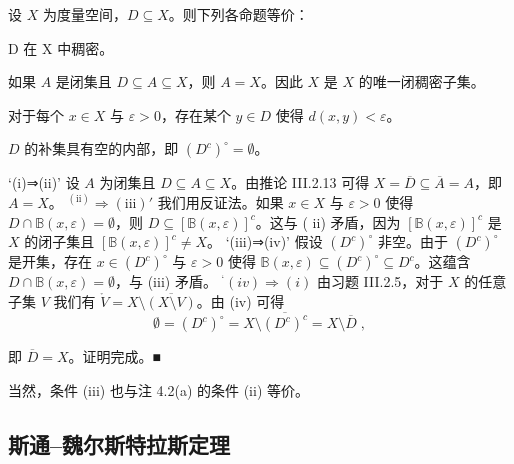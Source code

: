 \begin{proposition}

设 $X$ 为度量空间，$D \subseteq X$。则下列各命题等价：

\begin{subitems}
\item

D 在 X 中稠密。

\item

如果 $A$ 是闭集且 $D \subseteq A \subseteq X$，则 $A = X$。因此 $X$ 是 $X$ 的唯一闭稠密子集。

\item

对于每个  $ x \in X $ 与  $ \varepsilon > 0 $，存在某个  $ y \in D $ 使得  $ d(x, y) < \varepsilon $。

\item

$D$ 的补集具有空的内部，即 $(D^{c})^{\circ} = \emptyset$。

\proofhead
‘(i)⇒(ii)’ 设 $A$ 为闭集且 $D \subseteq A \subseteq X$。由推论 III.2.13 可得 $X = \overline{D} \subseteq \overline{A} = A$，即 $A = X$。
 $ ^(\text{ii}) \Rightarrow (\text{iii})' $ 我们用反证法。如果  $ x \in X $ 与  $ \varepsilon > 0 $ 使得  $ D \cap \mathbb{B}(x, \varepsilon) = \emptyset $，则  $ D \subseteq [\mathbb{B}(x, \varepsilon)]^c $。这与 ( $ \text{ii} $) 矛盾，因为  $ [\mathbb{B}(x, \varepsilon)]^c $ 是  $ X $ 的闭子集且  $ [\mathbb{B}(x, \varepsilon)]^c \neq X $。
‘(iii)⇒(iv)’ 假设 $(D^c)^\circ$ 非空。由于 $(D^c)^\circ$ 是开集，存在 $x\in(D^c)^\circ$ 与 $\varepsilon>0$ 使得 $\mathbb{B}(x,\varepsilon)\subseteq(D^c)^\circ\subseteq D^c$。这蕴含 $D\cap\mathbb{B}(x,\varepsilon)=\emptyset$，与 (iii) 矛盾。
 $ ^{‘}(iv)\Rightarrow(i) $ 由习题 III.2.5，对于  $ X $ 的任意子集  $ V $ 我们有  $ \mathring{V} = X \setminus \overline{(X \setminus V)} $。由 (iv) 可得
\[
\emptyset=(D^{c})^{\circ}=X\setminus\overline{{(D^{c})^{c}}}=X\setminus\overline{{D}}\;,
\]

即  $ \overline{D} = X $。证明完成。■

\end{subitems}

\end{proposition}

当然，条件 (iii) 也与注 4.2(a) 的条件 (ii) 等价。

\subsection*{斯通–魏尔斯特拉斯定理}

